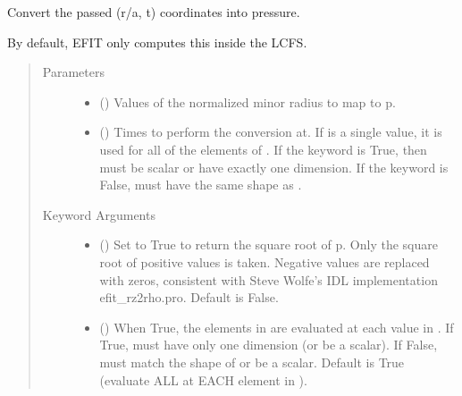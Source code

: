 \documentclass[letterpaper,10pt,english]{sphinxmanual}
\begin{document}
\begin{fulllineitems}
\begin{fulllineitems}
\end{fulllineitems}


\begin{fulllineitems}
\label{\detokenize{eqtools:eqtools.core.Equilibrium.roa2p}}
Convert the passed (r/a, t) coordinates into pressure.

By default, EFIT only computes this inside the LCFS.
\begin{quote}\begin{description}
\item[{Parameters}] \leavevmode\begin{itemize}
\item {} 
 () \textendash{} Values of the normalized minor
radius to map to p.

\item {} 
 () \textendash{} Times to perform the conversion at.
If  is a single value, it is used for all of the elements of
. If the  keyword is True, then  must be scalar
or have exactly one dimension. If the  keyword is False,
 must have the same shape as .

\end{itemize}

\item[{Keyword Arguments}] \leavevmode\begin{itemize}
\item {} 
 () \textendash{} Set to True to return the square root of p.
Only the square root of positive values is taken. Negative
values are replaced with zeros, consistent with Steve Wolfe’s
IDL implementation efit\_rz2rho.pro. Default is False.

\item {} 
 () \textendash{} When True, the elements in  are evaluated
at each value in . If True,  must have only one dimension
(or be a scalar). If False,  must match the shape of 
or be a scalar. Default is True (evaluate ALL  at EACH
element in ).


\end{itemize}
\end{description}
\end{quote}
\end{fulllineitems}
\end{fulllineitems}
\end{document}
